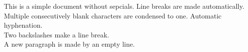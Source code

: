 \documentclass[a4paper, pdftex, ngerman]{article}
\begin{document}
\noindent This is a simple document without sepcials. Line breaks are made automatically. Multiple consecutively blank characters are condensed to one. Automatic hyphenation.\\
Two backslashes make a line break.\\

\noindent A new paragraph is made by an empty line.
\end{document}
